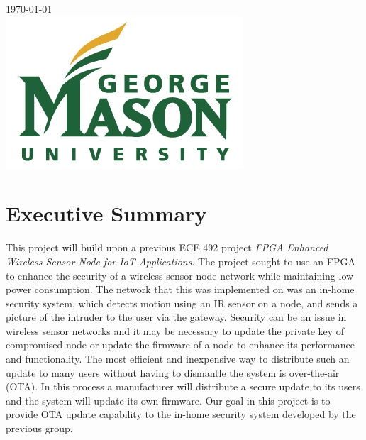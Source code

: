 \documentclass[11pt]{article}
\begin{document}
\begin{titlepage}

{\large \today}\\[2cm] %


\includegraphics{watermark2.jpg}\\[1cm] %
 

\vfill %

\end{titlepage}
\clearpage
\tableofcontents
\clearpage
\section{Executive Summary}

This project will build upon a previous ECE 492 project \textit{FPGA Enhanced Wireless Sensor Node for IoT Applications}. The project sought to use an FPGA to enhance the security of a wireless sensor node network while maintaining low power consumption. The network that this was implemented on was an in-home security system, which detects motion using an IR sensor on a node, and sends a picture of the intruder to the user via the gateway. Security can be an issue in wireless sensor networks and it may be necessary to update the private key of compromised node or update the firmware of a node to enhance its performance and functionality. The most efficient and inexpensive way to distribute such an update to many users without having to dismantle the system is over-the-air (OTA). In this process a manufacturer will distribute a secure update to its users and the system will update its own firmware. Our goal in this project is to provide OTA update capability to the in-home security system developed by the previous group. 
\clearpage
\end{document}
